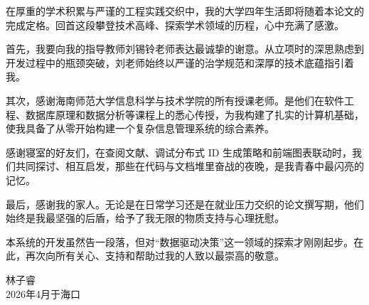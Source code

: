 \acknowledgement

在厚重的学术积累与严谨的工程实践交织中，我的大学四年生活即将随着本论文的完成定格。回首这段攀登技术高峰、探索学术领域的历程，心中充满了感激。

首先，我要向我的指导教师刘锡铃老师表达最诚挚的谢意。从立项时的深思熟虑到开发过程中的瓶颈突破，刘老师始终以严谨的治学规范和深厚的技术底蕴指引着我。

其次，感谢海南师范大学信息科学与技术学院的所有授课老师。是他们在软件工程、数据库原理和数据分析等课程上的悉心传授，为我构建了扎实的计算机基础，使我具备了从零开始构建一个复杂信息管理系统的综合素养。

感谢寝室的好友们，在查阅文献、调试分布式 ID 生成策略和前端图表联动时，我们共同探讨、相互启发，那些在代码与文档堆里奋战的夜晚，是我青春中最闪亮的记忆。

最后，感谢我的家人。无论是在日常学习还是在就业压力交织的论文撰写期，他们始终是我最坚强的后盾，给予了我无限的物质支持与心理抚慰。

本系统的开发虽然告一段落，但对“数据驱动决策”这一领域的探索才刚刚起步。在此，再次向所有关心、支持和帮助过我的人致以最崇高的敬意。

\vspace{2cm}
\begin{flushright}
    林子睿 \\
    2026年4月于海口
\end{flushright}